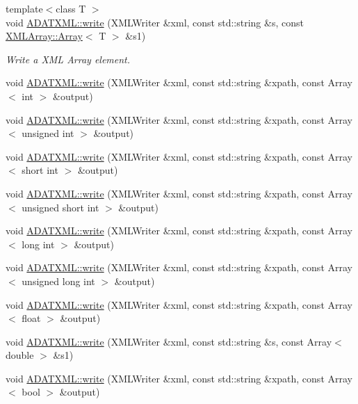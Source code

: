 \begin{DoxyCompactItemize}
{\footnotesize template$<$class T $>$ }\\void \mbox{\hyperlink{group__io_ga505002df14eea0ecd6a4c92bfdc6425d}{A\+D\+A\+T\+X\+M\+L\+::write}} (X\+M\+L\+Writer \&xml, const std\+::string \&s, const \mbox{\hyperlink{classXMLArray_1_1Array}{X\+M\+L\+Array\+::\+Array}}$<$ T $>$ \&s1)
\begin{DoxyCompactList}\small\item\em Write a X\+ML Array element. \end{DoxyCompactList}\item 
void \mbox{\hyperlink{group__io_ga79aaea02aba2cdc3c3374686eca9fd1e}{A\+D\+A\+T\+X\+M\+L\+::write}} (X\+M\+L\+Writer \&xml, const std\+::string \&xpath, const Array$<$ int $>$ \&output)
\item 
void \mbox{\hyperlink{group__io_ga69642f017daf4afef39564d30ba6cba1}{A\+D\+A\+T\+X\+M\+L\+::write}} (X\+M\+L\+Writer \&xml, const std\+::string \&xpath, const Array$<$ unsigned int $>$ \&output)
\item 
void \mbox{\hyperlink{group__io_ga5b987571b14df546fba76f92cb272d5d}{A\+D\+A\+T\+X\+M\+L\+::write}} (X\+M\+L\+Writer \&xml, const std\+::string \&xpath, const Array$<$ short int $>$ \&output)
\item 
void \mbox{\hyperlink{group__io_gaae1762f924e581123d4df61dff9b9f5b}{A\+D\+A\+T\+X\+M\+L\+::write}} (X\+M\+L\+Writer \&xml, const std\+::string \&xpath, const Array$<$ unsigned short int $>$ \&output)
\item 
void \mbox{\hyperlink{group__io_gaa86792c3bbc86036087623eee8f75f15}{A\+D\+A\+T\+X\+M\+L\+::write}} (X\+M\+L\+Writer \&xml, const std\+::string \&xpath, const Array$<$ long int $>$ \&output)
\item 
void \mbox{\hyperlink{group__io_gaa89a8fb5de3a6ff255c50428b84a232c}{A\+D\+A\+T\+X\+M\+L\+::write}} (X\+M\+L\+Writer \&xml, const std\+::string \&xpath, const Array$<$ unsigned long int $>$ \&output)
\item 
void \mbox{\hyperlink{group__io_ga37bab6df89540c0999683cb373ad2d3d}{A\+D\+A\+T\+X\+M\+L\+::write}} (X\+M\+L\+Writer \&xml, const std\+::string \&xpath, const Array$<$ float $>$ \&output)
\item 
void \mbox{\hyperlink{group__io_ga82a292d577216b66e12c9876c7fe7a10}{A\+D\+A\+T\+X\+M\+L\+::write}} (X\+M\+L\+Writer \&xml, const std\+::string \&s, const Array$<$ double $>$ \&s1)
\item 
void \mbox{\hyperlink{group__io_ga9a93f3084bfa9501e5fb5da53925c25d}{A\+D\+A\+T\+X\+M\+L\+::write}} (X\+M\+L\+Writer \&xml, const std\+::string \&xpath, const Array$<$ bool $>$ \&output)

\end{DoxyCompactItemize}
